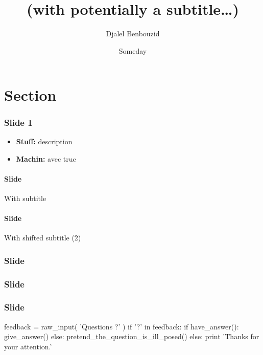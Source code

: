\documentclass[compress,xcolor=dvipsnames,svgnames]{beamer}
\begin{document}
\title{\selectfont{The title of the talk}\\\medskip
    \large\textcolor{beautyblue}{
    \textbf{(with potentially a subtitle\ldots)}} \medskip}
\author[{Djalel Benbouzid}]{\textcolor{grizoo}{Djalel Benbouzid}}
\date[someday\ldots]{Someday}%

\begin{frame}
\titlepage
\end{frame}

\section{Section}

\begin{frame}[c]
\frametitle{Slide 1}
\begin{itemize}
    \item \textbf{Stuff:} description 
    \item \textbf{Machin:} avec truc 
\end{itemize}
\end{frame}

\begin{frame}[c]
\framesubtitle{Slide}{With subtitle}
\blindtext
\end{frame}

\begin{frame}[c]
\framesubtitle[1cm]{Slide}{With shifted subtitle (2)}
\blindmathtrue
\blindtext
\end{frame}

\begin{frame}[c]
\frametitle[1cm]{Slide}
\blinditemize
\end{frame}

\begin{frame}[c]
\frametitle[1cm]{Slide}
\blinddescription
\end{frame}

\begin{frame}[c]
\frametitle[1cm]{Slide}
\blindenumerate
\end{frame}



\appendix
{}
\setcounter{finalframe}{\value{framenumber}}

\begin{frame} %
\begin{python}
feedback = raw_input( 'Questions ?' )
if '?' in feedback:
    if have_answer():
        give_answer()
    else:
        pretend_the_question_is_ill_posed()
else:
    print 'Thanks for your attention.'
\end{python}

\end{frame}

%         
%         

\setcounter{framenumber}{\value{finalframe}}
\end{document}
